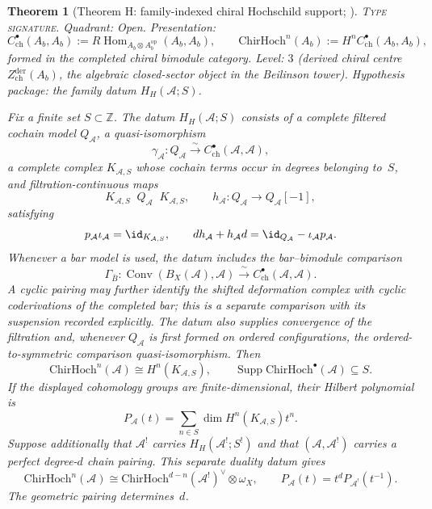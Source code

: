 \documentclass[11pt]{article}
\theoremstyle{plain}
\newtheorem{theorem}{Theorem}[section]
\theoremstyle{definition}
\theoremstyle{remark}
\newcommand{\cA}{\mathcal{A}}
\newcommand{\ChirHoch}{\mathrm{ChirHoch}}
\begin{document}
\begin{theorem}[Theorem H: family-indexed chiral Hochschild support;
\ClaimStatusConditional]
\label{thm:hochschild}
\textsc{Type signature.} Quadrant: Open. Presentation:
\[
 C^\bullet_{\mathrm{ch}}(A_b,A_b)
 :=R\!\operatorname{Hom}_{A_b\otimes A_b^{\mathrm{op}}}(A_b,A_b),
 \qquad
 \mathrm{ChirHoch}^n(A_b):=H^nC^\bullet_{\mathrm{ch}}(A_b,A_b),
\]
formed in the completed chiral bimodule category. Level: $3$
(derived chiral centre $Z^{\mathrm{der}}_{\mathrm{ch}}(A_b)$,
the algebraic closed-sector object in the Beilinson tower).
Hypothesis package: the family datum $H_H(\cA;S)$.

Fix a finite set $S\subset\mathbb Z$.  The datum
$H_H(\cA;S)$ consists of a complete filtered cochain model $Q_\cA$,
a quasi-isomorphism
\[
 \gamma_\cA\colon Q_\cA\xrightarrow{\ \sim\ }
 C^\bullet_{\mathrm{ch}}(\cA,\cA),
\]
a complete complex $K_{\cA,S}$ whose cochain terms occur in degrees
belonging to~$S$, and filtration-continuous maps
\[
 K_{\cA,S}\mathop{\xrightarrow{\ \iota_\cA\ }}Q_\cA
 \mathop{\xrightarrow{\ p_\cA\ }}K_{\cA,S},
 \qquad h_\cA\colon Q_\cA\longrightarrow Q_\cA[-1],
\]
satisfying
\[
 p_\cA\iota_\cA=\id_{K_{\cA,S}},
 \qquad
 dh_\cA+h_\cA d=\id_{Q_\cA}-\iota_\cA p_\cA.
\]
Whenever a bar model is used, the datum includes the bar--bimodule
comparison
\[
 \Gamma_{\bar B}\colon
 \operatorname{Conv}(B_X(\cA),\cA)
 \xrightarrow{\ \sim\ }C^\bullet_{\mathrm{ch}}(\cA,\cA).
\]
A cyclic pairing may further identify the shifted deformation complex
with cyclic coderivations of the completed bar; this is a separate
comparison with its suspension recorded explicitly.  The datum also
supplies convergence of the filtration and, whenever
$Q_\cA$ is first formed on ordered configurations, the
ordered-to-symmetric comparison quasi-isomorphism.  Then
\begin{equation}\label{eq:theorem-H-family-support-standalone}
 \ChirHoch^n(\cA)\cong H^n(K_{\cA,S}),
 \qquad
 \operatorname{Supp}\ChirHoch^\bullet(\cA)\subseteq S.
\end{equation}
If the displayed cohomology groups are finite-dimensional, their
Hilbert polynomial is
\begin{equation}\label{eq:hilbert-poly}
P_\cA(t)
 =\sum_{n\in S}\dim H^n(K_{\cA,S})t^n.
\end{equation}
Suppose additionally that $\cA^!$ carries $H_H(\cA^!;S^!)$ and that
$(\cA,\cA^!)$ carries a perfect degree-$d$ chain pairing.  This
separate duality datum gives
\[
 \ChirHoch^n(\cA)
 \cong
 \ChirHoch^{d-n}(\cA^!)^\vee\otimes\omega_X,
 \qquad
 P_\cA(t)=t^dP_{\cA^!}(t^{-1}).
\]
The geometric pairing determines~$d$.
\end{theorem}
\end{document}
